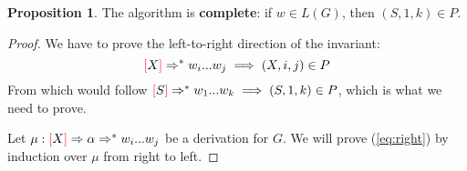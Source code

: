 \documentclass[12pt]{extarticle}
\theoremstyle{definition} \newtheorem{defn}{Definition}
\theoremstyle{definition} \newtheorem{prop}{Proposition}
\newcommand{\lb}{\textcolor{red}{[}}
\newcommand{\rb}{\textcolor{red}{]}}
\begin{document}
\begin{prop}
    The algorithm is \textbf{complete}: if $w \in L(G)$, then $(S, 1, k) \in P$.
\end{prop}
\begin{proof}
    We have to prove the left-to-right direction of the invariant:
    \begin{equation}\label{eq:right}
        \lb X \rb \Rightarrow^* w_i ... w_j \implies (X, i, j) \in P
    \end{equation}
    From which would follow $ \lb S \rb \Rightarrow^* w_1 ... w_k \implies (S, 1, k) \in P$,
    which is what we need to prove.

    Let $\mu: \lb X \rb \Rightarrow \alpha \Rightarrow^* w_i ... w_j$
    be a derivation for $G$. We will prove (\ref{eq:right}) by induction over
    $\mu$ from right to left.


\end{proof}
\end{document}

